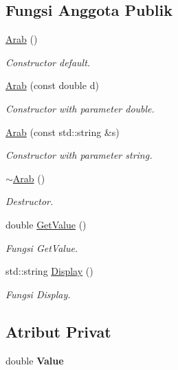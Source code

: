 \subsection*{Fungsi Anggota Publik}
\begin{DoxyCompactItemize}
\item 
\hyperlink{classArab_afdddf6ff9c7724ddb71c625db0847893}{Arab} ()
\begin{DoxyCompactList}\small\item\em Constructor default. \end{DoxyCompactList}\item 
\hyperlink{classArab_add184fe39f6fc81d20f5b26d4b9758a3}{Arab} (const double d)
\begin{DoxyCompactList}\small\item\em Constructor with parameter double. \end{DoxyCompactList}\item 
\hyperlink{classArab_a28e10b4e58b32730dce2a4f3f98a825e}{Arab} (const std\+::string \&s)
\begin{DoxyCompactList}\small\item\em Constructor with parameter string. \end{DoxyCompactList}\item 
\hyperlink{classArab_a2629b0540731753334ebb19161774f7a}{$\sim$\+Arab} ()
\begin{DoxyCompactList}\small\item\em Destructor. \end{DoxyCompactList}\item 
double \hyperlink{classArab_ac0fb43a1da728805bec9add68fd46fa0}{Get\+Value} ()
\begin{DoxyCompactList}\small\item\em Fungsi Get\+Value. \end{DoxyCompactList}\item 
std\+::string \hyperlink{classArab_a96e515d21840b8ddfe50414505618200}{Display} ()
\begin{DoxyCompactList}\small\item\em Fungsi Display. \end{DoxyCompactList}\end{DoxyCompactItemize}
\subsection*{Atribut Privat}
\begin{DoxyCompactItemize}
\item 
\hypertarget{classArab_a1f491a08c53d1f8b5450a0c8deefc1f4}{}double {\bfseries Value}\label{classArab_a1f491a08c53d1f8b5450a0c8deefc1f4}

\end{DoxyCompactItemize}


